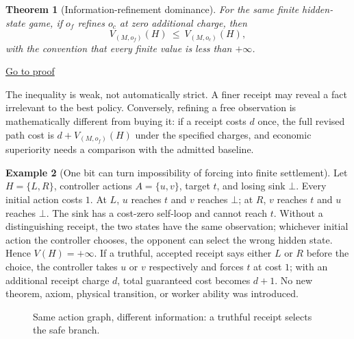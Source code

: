 \documentclass[11pt,letterpaper]{article}
\newtheorem{theorem}{Theorem}[section]
\theoremstyle{definition}
\newtheorem{example}[theorem]{Example}
\theoremstyle{remark}
\newcommand{\backproof}[1]{\hfill\hyperlink{proof:#1}{\footnotesize Go to proof}}
\begin{document}
\begin{theorem}[Information-refinement dominance]\label{thm:info}\hypertarget{stmt:info}{}
For the same finite hidden-state game, if $o_f$ refines $o_c$ at zero additional charge, then
\[
 V_{(M,o_f)}(H)\ \le\ V_{(M,o_c)}(H),
\]
with the convention that every finite value is less than $+\infty$.
\end{theorem}\backproof{info}

The inequality is weak, not automatically strict. A finer receipt may reveal a fact irrelevant to the best policy. Conversely, refining a free observation is mathematically different from buying it: if a receipt costs $d$ once, the full revised path cost is $d+V_{(M,o_f)}(H)$ under the specified charges, and economic superiority needs a comparison with the admitted baseline.

\begin{example}[One bit can turn impossibility of forcing into finite settlement]\label{ex:twobit}
Let $H=\{L,R\}$, controller actions $A=\{u,v\}$, target $t$, and losing sink $\bot$. Every initial action costs $1$. At $L$, $u$ reaches $t$ and $v$ reaches $\bot$; at $R$, $v$ reaches $t$ and $u$ reaches $\bot$. The sink has a cost-zero self-loop and cannot reach $t$. Without a distinguishing receipt, the two states have the same observation; whichever initial action the controller chooses, the opponent can select the wrong hidden state. Hence $V(H)=+\infty$. If a truthful, accepted receipt says either $L$ or $R$ before the choice, the controller takes $u$ or $v$ respectively and forces $t$ at cost $1$; with an additional receipt charge $d$, total guaranteed cost becomes $d+1$. No new theorem, axiom, physical transition, or worker ability was introduced.
\end{example}

\begin{figure}[ht]
\centering{}
\caption{Same action graph, different information: a truthful receipt selects the safe branch.}
\end{figure}
\end{document}
